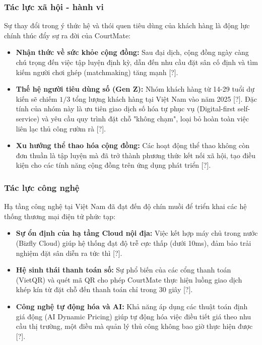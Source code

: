 \subsubsection{Tác lực xã hội - hành vi}
Sự thay đổi trong ý thức hệ và thói quen tiêu dùng của khách hàng là động lực chính thúc đẩy sự ra đời của CourtMate:
\begin{itemize}
    \item \textbf{Nhận thức về sức khỏe cộng đồng:} Sau đại dịch, cộng đồng ngày càng chú trọng đến việc tập luyện định kỳ, dẫn đến nhu cầu đặt sân cố định và tìm kiếm người chơi ghép (matchmaking) tăng mạnh [?].
    \item \textbf{Thế hệ người tiêu dùng số (Gen Z):} Nhóm khách hàng từ 14-29 tuổi dự kiến sẽ chiếm $1/3$ tổng lượng khách hàng tại Việt Nam vào năm 2025 [?]. Đặc tính của nhóm này là ưu tiên giao dịch số hóa tự phục vụ (Digital-first self-service) và yêu cầu quy trình đặt chỗ "không chạm", loại bỏ hoàn toàn việc liên lạc thủ công rườm rà  [?].
    \item \textbf{Xu hướng thể thao hóa cộng đồng:} Các hoạt động thể thao không còn đơn thuần là tập luyện mà đã trở thành phương thức kết nối xã hội, tạo điều kiện cho các tính năng cộng đồng trên ứng dụng phát triển [?].
\end{itemize}

\subsubsection{Tác lực công nghệ}
Hạ tầng công nghệ tại Việt Nam đã đạt đến độ chín muồi để triển khai các hệ thống thương mại điện tử phức tạp:
\begin{itemize}
    \item \textbf{Sự ổn định của hạ tầng Cloud nội địa:} Việc kết hợp máy chủ trong nước (Bizfly Cloud) giúp hệ thống đạt độ trễ cực thấp (dưới 10ms), đảm bảo trải nghiệm đặt sân diễn ra tức thì [?].
    \item \textbf{Hệ sinh thái thanh toán số:} Sự phổ biến của các cổng thanh toán (VietQR) và quét mã QR cho phép CourtMate thực hiện luồng giao dịch khép kín từ đặt chỗ đến thanh toán chỉ trong 30 giây [?].
    \item \textbf{Công nghệ tự động hóa và AI:} Khả năng áp dụng các thuật toán định giá động (AI Dynamic Pricing) giúp tự động hóa việc điều tiết giá theo nhu cầu thị trường, một điều mà quản lý thủ công không bao giờ thực hiện được [?].
\end{itemize}

